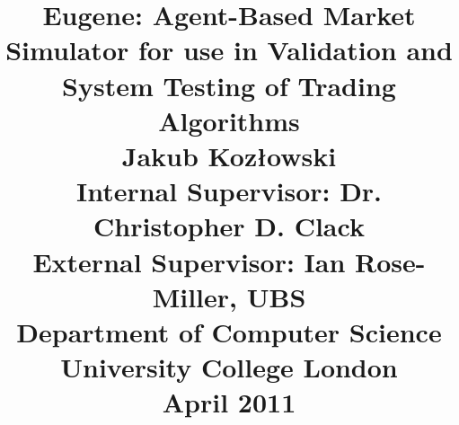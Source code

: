 \title{
\Large{\textbf{Eugene: Agent-Based Market Simulator for use in Validation and System Testing of Trading Algorithms}}\\[1.2cm]
\normalsize{Jakub Koz\l{}owski \\
Internal Supervisor: Dr. Christopher D. Clack \\
External Supervisor: Ian Rose-Miller, UBS \\[1.2cm]
Department of Computer Science \\University College London \\[1cm]}
\small{April 2011}
}
\author{} \date{}

\maketitle